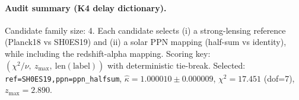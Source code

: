 \paragraph{Audit summary (K4 delay dictionary).} \AuditTag Candidate family size: 4. Each candidate selects (i) a strong-lensing reference (Planck18 vs SH0ES19) and (ii) a solar PPN mapping (half-sum vs identity), while including the redshift-alpha mapping. Scoring key: $(\chi^2/\nu,\ z_{\max},\ \mathrm{len}(\mathrm{label}))$ with deterministic tie-break.
\noindent\AuditTag Selected: \texttt{ref=SH0ES19,ppn=ppn\_halfsum}, $\widehat\kappa=1.000010\pm0.000009$, $\chi^2=17.451$ (dof=7), $z_{\max}=2.890$.